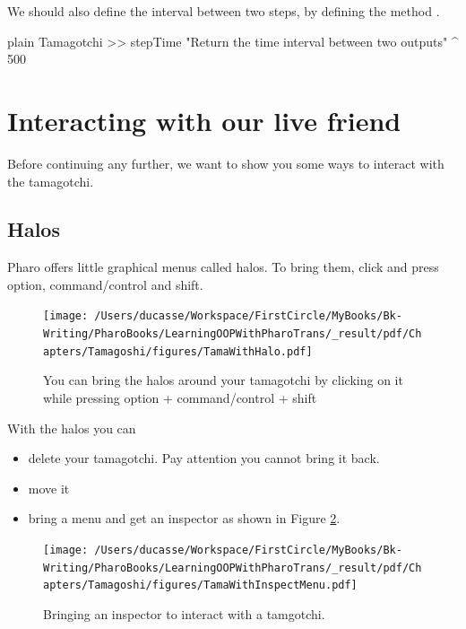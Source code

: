 \documentclass[10pt,twoside,english]{_support/latex/sbabook/sbabook}
\begin{document}
We should also define the interval between two steps, by defining the method .

\begin{displaycode}{plain}
Tamagotchi >> stepTime 
	"Return the time interval between two outputs"
	^ 500
\end{displaycode}
\section{Interacting with our live friend}
Before continuing any further, we want to show you some ways to interact with the tamagotchi.
\subsection{Halos}
Pharo offers little graphical menus called halos. To bring them, click and press option, command/control and shift.


\begin{figure}

\begin{center}
\texttt{[image: /Users/ducasse/Workspace/FirstCircle/MyBooks/Bk-Writing/PharoBooks/LearningOOPWithPharoTrans/\_result/pdf/Chapters/Tamagoshi/figures/TamaWithHalo.pdf]}\caption{You can bring the halos around your tamagotchi by clicking on it while pressing option + command/control + shift \label{TamaWithHalo}}\end{center}
\end{figure}


With the halos you can 

\begin{itemize}
\item delete your tamagotchi. Pay attention you cannot bring it back.
\item move it
\item bring a menu and get an inspector as shown in Figure \ref{TamaWithInspectMenu}.
\end{itemize}


\begin{figure}

\begin{center}
\texttt{[image: /Users/ducasse/Workspace/FirstCircle/MyBooks/Bk-Writing/PharoBooks/LearningOOPWithPharoTrans/\_result/pdf/Chapters/Tamagoshi/figures/TamaWithInspectMenu.pdf]}\caption{Bringing an inspector to interact with a tamgotchi.\label{TamaWithInspectMenu}}\end{center}
\end{figure}
\end{document}
